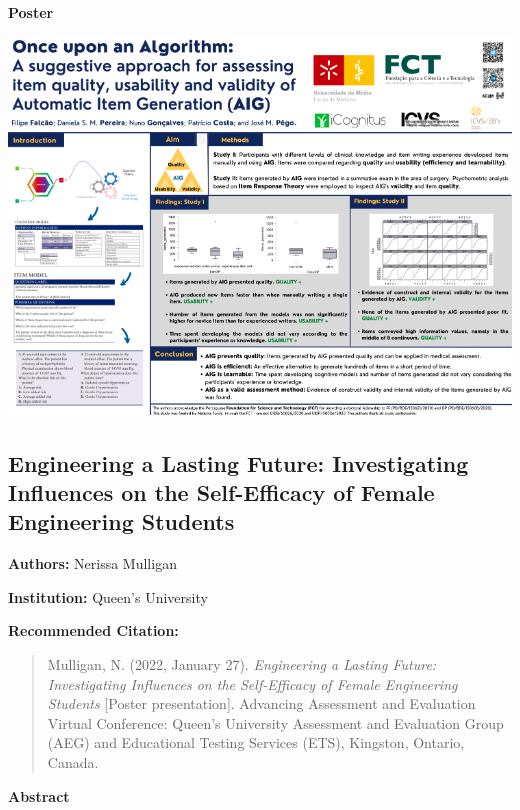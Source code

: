\documentclass[
]{book}
\begin{document}
\textbf{Poster}

\includegraphics{Content/FF.png}

\newpage

\hypertarget{engineering-a-lasting-future-investigating-influences-on-the-self-efficacy-of-female-engineering-students}{%
\subsection{Engineering a Lasting Future: Investigating Influences on the Self-Efficacy of Female Engineering Students}\label{engineering-a-lasting-future-investigating-influences-on-the-self-efficacy-of-female-engineering-students}}

\textbf{Authors:} Nerissa Mulligan

\textbf{Institution:} Queen's University

\textbf{Recommended Citation:}

\begin{quote}
Mulligan, N. (2022, January 27). \emph{Engineering a Lasting Future: Investigating Influences on the Self-Efficacy of Female Engineering Students} {[}Poster presentation{]}. Advancing Assessment and Evaluation Virtual Conference: Queen's University Assessment and Evaluation Group (AEG) and Educational Testing Services (ETS), Kingston, Ontario, Canada.
\end{quote}

\textbf{Abstract}
\end{document}
